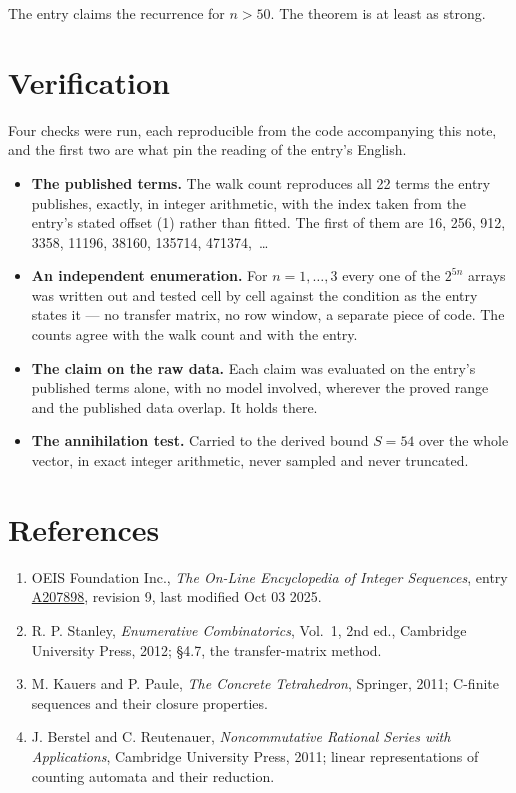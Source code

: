 \documentclass[11pt]{article}
\theoremstyle{definition}
\begin{document}
The entry claims the recurrence for $n > 50$. The theorem is at least as strong.

\section{Verification}

Four checks were run, each reproducible from the code accompanying this note, and the first two are what pin the reading of the entry's English.

\begin{itemize}

\item {\bfseries The published terms.} The walk count reproduces all 22 terms the entry publishes, exactly, in integer arithmetic, with the index taken from the entry's stated offset (1) rather than fitted. The first of them are 16, 256, 912, 3358, 11196, 38160, 135714, 471374,~\dots

\item {\bfseries An independent enumeration.} For $n = 1,\dots,3$ every one of the $2^{5n}$ arrays was written out and tested cell by cell against the condition as the entry states it --- no transfer matrix, no row window, a separate piece of code. The counts agree with the walk count and with the entry.

\item {\bfseries The claim on the raw data.} Each claim was evaluated on the entry's published terms alone, with no model involved, wherever the proved range and the published data overlap. It holds there.

\item {\bfseries The annihilation test.} Carried to the derived bound $S = 54$ over the whole vector, in exact integer arithmetic, never sampled and never truncated.

\end{itemize}

\section{References}

\begin{enumerate}

\item OEIS Foundation Inc., \emph{The On-Line Encyclopedia of Integer Sequences}, entry \href{https://oeis.org/A207898}{A207898}, revision 9, last modified Oct 03 2025.

\item R. P. Stanley, \emph{Enumerative Combinatorics}, Vol.~1, 2nd ed., Cambridge University Press, 2012; \S4.7, the transfer-matrix method.

\item M. Kauers and P. Paule, \emph{The Concrete Tetrahedron}, Springer, 2011; C-finite sequences and their closure properties.

\item J. Berstel and C. Reutenauer, \emph{Noncommutative Rational Series with Applications}, Cambridge University Press, 2011; linear representations of counting automata and their reduction.

\end{enumerate}
\end{document}
